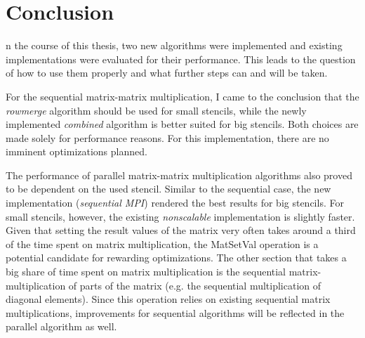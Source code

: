 \chapter*{Conclusion}

n the course of this thesis, two new algorithms were implemented and existing implementations were evaluated for their performance. This leads to the question of how to use them properly and what further steps can and will be taken. 

For the sequential matrix-matrix multiplication, I came to the conclusion that the \textit{rowmerge} algorithm should be used for small stencils, while the newly implemented \textit{combined} algorithm is better suited for big stencils. Both choices are made solely for performance reasons. For this implementation, there are no imminent optimizations planned. 

The performance of parallel matrix-matrix multiplication algorithms also proved to be dependent on the used stencil. Similar to the sequential case, the new implementation (\textit{sequential MPI}) rendered the best results for big stencils.%
For small stencils, however, the existing \textit{nonscalable} implementation is slightly faster. Given that setting the result values of the matrix very often takes around a third of the time spent on matrix multiplication, the MatSetVal operation is a potential candidate for rewarding optimizations. The other section that takes a big share of time spent on matrix multiplication is the sequential matrix-multiplication of parts of the matrix (e.g. the sequential multiplication of diagonal elements). Since this operation relies on existing sequential matrix multiplications, improvements for sequential algorithms will be reflected in the parallel algorithm as well.
